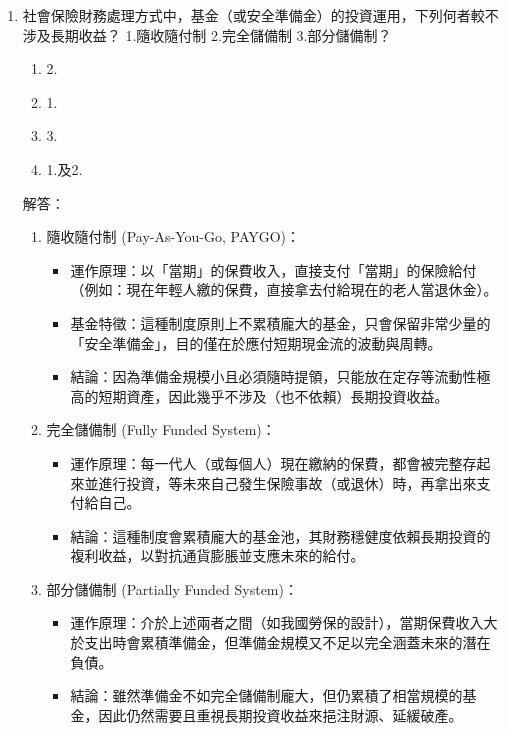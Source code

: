 \documentclass[12pt, a4paper]{article}
\begin{document}
\begin{enumerate}
    \item 社會保險財務處理方式中，基金（或安全準備金）的投資運用，下列何者較不涉及長期收益？ 1.隨收隨付制 2.完全儲備制 3.部分儲備制？
    \begin{enumerate}[label=\Alph*.]
        \item 2.
        \item 1.
        \item 3.
        \item 1.及2.
    \end{enumerate}
    解答：
    \begin{enumerate}[1.]
        \item 隨收隨付制 (Pay-As-You-Go, PAYGO)：
        \begin{itemize}
            \item 運作原理：以「當期」的保費收入，直接支付「當期」的保險給付（例如：現在年輕人繳的保費，直接拿去付給現在的老人當退休金）。
            \item 基金特徵：這種制度原則上不累積龐大的基金，只會保留非常少量的「安全準備金」，目的僅在於應付短期現金流的波動與周轉。
            \item 結論：因為準備金規模小且必須隨時提領，只能放在定存等流動性極高的短期資產，因此幾乎不涉及（也不依賴）長期投資收益。
        \end{itemize}
        \item 完全儲備制 (Fully Funded System)：
        \begin{itemize}
            \item 運作原理：每一代人（或每個人）現在繳納的保費，都會被完整存起來並進行投資，等未來自己發生保險事故（或退休）時，再拿出來支付給自己。
            \item 結論：這種制度會累積龐大的基金池，其財務穩健度依賴長期投資的複利收益，以對抗通貨膨脹並支應未來的給付。
        \end{itemize}
        \item 部分儲備制 (Partially Funded System)：
        \begin{itemize}
            \item 運作原理：介於上述兩者之間（如我國勞保的設計），當期保費收入大於支出時會累積準備金，但準備金規模又不足以完全涵蓋未來的潛在負債。
            \item 結論：雖然準備金不如完全儲備制龐大，但仍累積了相當規模的基金，因此仍然需要且重視長期投資收益來挹注財源、延緩破產。
        \end{itemize}
    \end{enumerate}



\end{enumerate}
\end{document}
